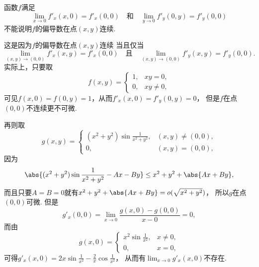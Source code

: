 \begin{remark}
函数\(f\)满足\begin{equation*}
	\lim_{x\to0} f'_x(x,0) = f'_x(0,0)
	\quad\text{和}\quad
	\lim_{y\to0} f'_y(0,y) = f'_y(0,0)
\end{equation*}
不能说明\(f\)的偏导数在点\((x,y)\)连续.

这是因为\(f\)的偏导数在点\((x,y)\)连续
当且仅当\begin{equation*}
	\lim_{(x,y)\to(0,0)} f'_x(x,y) = f'_x(0,0)
	\quad\text{且}\quad
	\lim_{(x,y)\to(0,0)} f'_y(x,y) = f'_y(0,0).
\end{equation*}
实际上，只要取\begin{equation*}
	f(x,y) = \left\{ \begin{array}{cl}
		1, & xy = 0, \\
		0, & xy \neq 0,
	\end{array} \right.
\end{equation*}
可见\(f(x,0) = f(0,y) = 1\)，从而\(f'_x(x,0) = f'_y(0,y) = 0\)，
但是\(f\)在点\((0,0)\)不连续更不可微.

再则取\begin{equation*}
	g(x,y) = \left\{ \begin{array}{cl}
		(x^2+y^2) \sin\frac1{x^2+y^2}, & (x,y)\neq(0,0), \\
		0, & (x,y)=(0,0),
	\end{array} \right.
\end{equation*}
因为\begin{equation*}
	\abs{(x^2+y^2) \sin\frac1{x^2+y^2} - A x - B y}
	\leq x^2 + y^2 + \abs{A x + B y},
\end{equation*}
而且只要\(A = B = 0\)就有\(x^2 + y^2 + \abs{A x + B y} = o(\sqrt{x^2 + y^2})\)，
所以\(g\)在点\((0,0)\)可微.
但是\begin{equation*}
	g'_x(0,0) = \lim_{x\to0} \frac{g(x,0) - g(0,0)}{x - 0} = 0,
\end{equation*}
而由\begin{equation*}
	g(x,0) = \left\{ \begin{array}{cl}
		x^2 \sin\frac1{x^2}, & x\neq0, \\
		0, & x=0,
	\end{array} \right.
\end{equation*}可得\(g'_x(x,0) = 2x \sin\frac1{x^2} - \frac2x \cos\frac1{x^2}\)，
从而有\(\lim_{x\to0} g'_x(x,0)\)不存在.
\end{remark}

